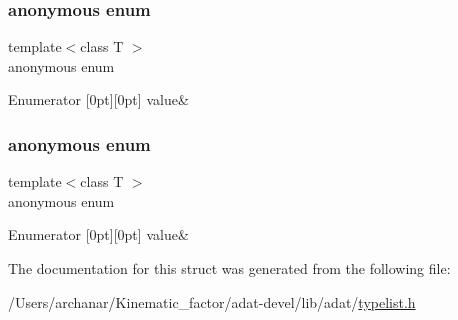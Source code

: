 \subsubsection{\texorpdfstring{anonymous enum}{anonymous enum}}
{\footnotesize\ttfamily template$<$class T $>$ \\
anonymous enum}

\begin{DoxyEnumFields}{Enumerator}
[0pt][0pt]{}\mbox{\label{structUtil_1_1TL_1_1IndexOf_3_01NullType_00_01T_01_4_afe447148141f7ffca0c03ac8d4c3f09eab7ce1862f00c3baa377293bbd01efe32}} 
value&\\
\hline

\end{DoxyEnumFields}
\mbox{\label{structUtil_1_1TL_1_1IndexOf_3_01NullType_00_01T_01_4_afe447148141f7ffca0c03ac8d4c3f09e}} 
\subsubsection{\texorpdfstring{anonymous enum}{anonymous enum}}
{\footnotesize\ttfamily template$<$class T $>$ \\
anonymous enum}

\begin{DoxyEnumFields}{Enumerator}
[0pt][0pt]{}\mbox{\label{structUtil_1_1TL_1_1IndexOf_3_01NullType_00_01T_01_4_afe447148141f7ffca0c03ac8d4c3f09eab7ce1862f00c3baa377293bbd01efe32}} 
value&\\
\hline

\end{DoxyEnumFields}


The documentation for this struct was generated from the following file\+:\begin{DoxyCompactItemize}
\item 
/\+Users/archanar/\+Kinematic\+\_\+factor/adat-\/devel/lib/adat/\mbox{\hyperlink{adat-devel_2lib_2adat_2typelist_8h}{typelist.\+h}}\end{DoxyCompactItemize}
